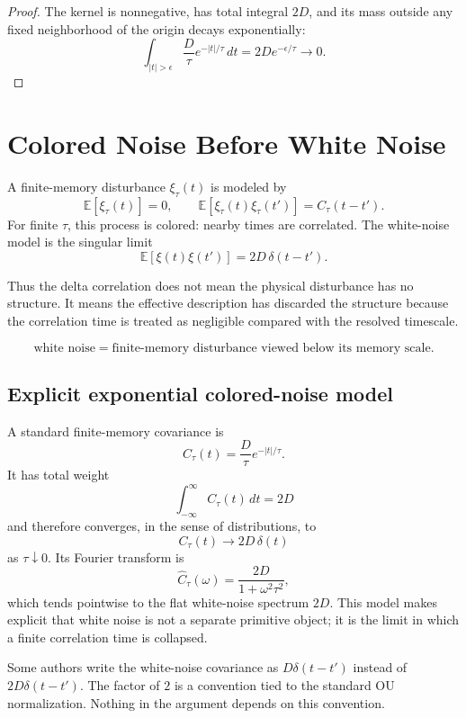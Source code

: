 \documentclass[11pt]{article}
\begin{document}
\begin{proof}
The kernel is nonnegative, has total integral \(2D\), and its mass outside any fixed neighborhood of the origin decays exponentially:
\[
\int_{|t|>\epsilon}\frac{D}{\tau}e^{-|t|/\tau}\,dt
=2D e^{-\epsilon/\tau}\to0.
\]
\end{proof}

\section{Colored Noise Before White Noise}

A finite-memory disturbance \(\xi_\tau(t)\) is modeled by
\[
\mathbb E[\xi_\tau(t)]=0,
\qquad
\mathbb E[\xi_\tau(t)\xi_\tau(t')]=C_\tau(t-t').
\]
For finite \(\tau\), this process is colored: nearby times are correlated. The white-noise model is the singular limit
\[
\mathbb E[\xi(t)\xi(t')]=2D\,\delta(t-t').
\]

Thus the delta correlation does not mean the physical disturbance has no structure. It means the effective description has discarded the structure because the correlation time is treated as negligible compared with the resolved timescale.

\[
\boxed{
\text{white noise}=
\text{finite-memory disturbance viewed below its memory scale}.
}
\]

\subsection{Explicit exponential colored-noise model}

A standard finite-memory covariance is
\[
C_\tau(t)=\frac{D}{\tau}e^{-|t|/\tau}.
\]
It has total weight
\[
\int_{-\infty}^{\infty}C_\tau(t)\,dt=2D
\]
and therefore converges, in the sense of distributions, to
\[
C_\tau(t)\longrightarrow 2D\,\delta(t)
\]
as \(\tau\downarrow0\). Its Fourier transform is
\[
\widehat C_\tau(\omega)=\frac{2D}{1+\omega^2\tau^2},
\]
which tends pointwise to the flat white-noise spectrum \(2D\). This model makes explicit that white noise is not a separate primitive object; it is the limit in which a finite correlation time is collapsed.

\begin{remark}[Normalization]
Some authors write the white-noise covariance as \(D\delta(t-t')\) instead of \(2D\delta(t-t')\). The factor of \(2\) is a convention tied to the standard OU normalization. Nothing in the argument depends on this convention.
\end{remark}
\end{document}
